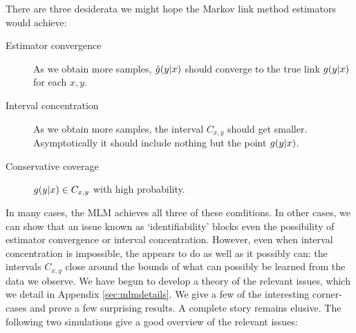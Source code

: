 There are three desiderata we might hope the Markov link method estimators would achieve:
\begin{description}
    \item[Estimator convergence] As we obtain more samples, $\hat {g}(y|x)$ should converge to the true link $g(y|x)$ for each $x,y$.
    \item[Interval concentration] As we obtain more samples, the interval $C_{x,y}$ should get smaller. Asymptotically it should include nothing but the point $g(y|x)$.
    \item[Conservative coverage] $g(y|x) \in C_{x,y}$ with high probability.
\end{description}
In many cases, the MLM achieves all three of these conditions.  In other cases, we can show that an issue known as `identifiability' blocks even the possibility of estimator convergence or interval concentration.  However, even when interval concentration is impossible, the \MLM{} appears to do as well as it possibly can: the intervals $C_{x,y}$ close around the bounds of what can possibly be learned from the data we observe.  We have begun to develop a theory of the relevant issues, which we detail in Appendix \ref{sec:mlmdetails}.  We give a few of the interesting corner-cases and prove a few surprising results.  A complete story remains elusive.  The following two simulations give a good overview of the relevant issues:


